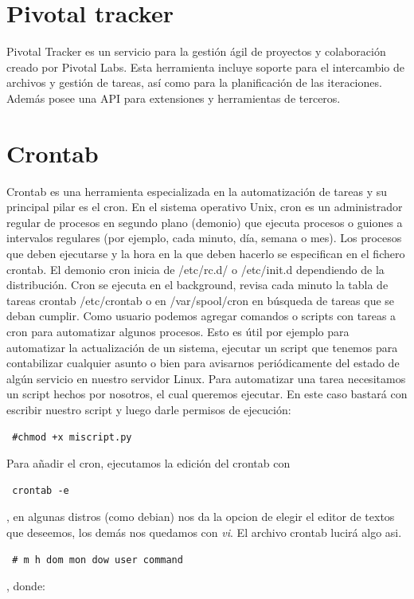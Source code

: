 \documentclass[a4paper, 12pt]{book}
\begin{document}
\section{Pivotal tracker}
\label{sec:pivotal}
Pivotal Tracker es un servicio para la gesti\'on \'agil de proyectos y colaboraci\'on creado por Pivotal Labs. Esta herramienta incluye soporte 
para el intercambio de archivos y gesti\'on de tareas, as\'i como para la planificaci\'on de las iteraciones. Adem\'as posee una API para extensiones y 
herramientas de terceros.


\section{Crontab}
\label{sec:crontab}
Crontab es una herramienta especializada en la automatizaci\'on de tareas y su principal pilar es el cron. 
En el sistema operativo Unix, cron es un administrador regular de procesos en segundo plano (demonio) que ejecuta procesos o guiones a intervalos 
regulares (por ejemplo, cada minuto, d\'ia, semana o mes). Los procesos que deben ejecutarse y la hora en la que deben hacerlo se especifican en el fichero 
crontab.
El demonio cron inicia de /etc/rc.d/ o /etc/init.d dependiendo de la distribuci\'on. Cron se ejecuta en el background, revisa cada minuto la tabla de tareas
crontab /etc/crontab o en /var/spool/cron en b\'usqueda de tareas que se deban cumplir. Como usuario podemos agregar comandos o scripts con tareas a cron 
para automatizar algunos procesos. Esto es \'util por ejemplo para automatizar la actualizaci\'on de un sistema, ejecutar un script que tenemos para 
contabilizar cualquier asunto o bien para avisarnos peri\'odicamente del estado de alg\'un servicio en nuestro servidor Linux.
Para automatizar una tarea necesitamos un script hechos por nosotros, el cual queremos ejecutar. En este caso bastar\'a con escribir nuestro script y 
luego darle permisos de ejecuci\'on: 
  \begin{verbatim} #chmod +x miscript.py \end{verbatim}
Para a\~nadir el cron, ejecutamos la edici\'on del crontab con \begin{verbatim} crontab -e \end{verbatim}, en algunas distros (como debian) nos da la opcion 
de elegir el editor de textos que deseemos, los dem\'as nos quedamos con \textit{vi}. El archivo crontab lucir\'a algo asi. 
  \begin{verbatim} # m h dom mon dow user command \end{verbatim}, donde:
\end{document}
